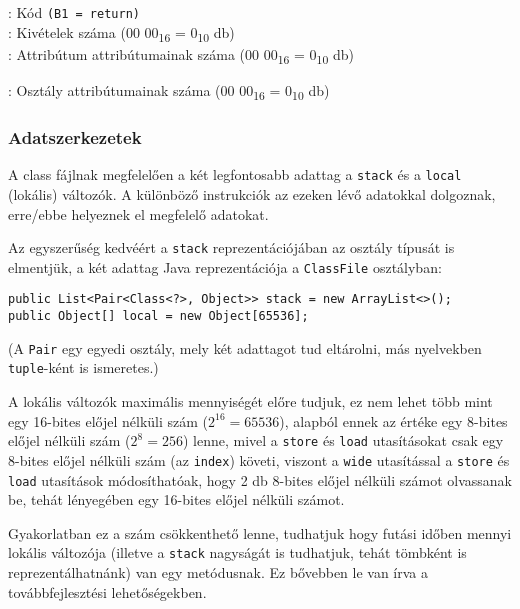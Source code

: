 \begin{compactitem}
\begin{compactitem}
\begin{compactitem}
\begin{compactitem}
                : Kód \lstinline{(B1 = return)}  \\
                : Kivételek száma (00 00\textsubscript{16} = 0\textsubscript{10} db) \\
                : Attribútum attribútumainak száma (00 00\textsubscript{16} = 0\textsubscript{10} db)
        \end{compactitem}
    \end{compactitem}
\end{compactitem}
\item {}: Osztály attribútumainak száma (00 00\textsubscript{16} = 0\textsubscript{10} db)
\end{compactitem}

\subsubsection{Adatszerkezetek}

A class fájlnak megfelelően a két legfontosabb adattag a \lstinline{stack} és a \lstinline{local} (lokális) változók. A különböző instrukciók az ezeken lévő adatokkal dolgoznak, erre/ebbe helyeznek el megfelelő adatokat.

Az egyszerűség kedvéért a \lstinline{stack} reprezentációjában az osztály típusát is elmentjük, a két adattag Java reprezentációja a \lstinline{ClassFile} osztályban:
\begin{verbatim}
public List<Pair<Class<?>, Object>> stack = new ArrayList<>();
public Object[] local = new Object[65536];
\end{verbatim}
(A \lstinline{Pair} egy egyedi osztály, mely két adattagot tud eltárolni, más nyelvekben \lstinline{tuple}-ként is ismeretes.)

A lokális változók maximális mennyiségét előre tudjuk, ez nem lehet több mint egy 16-bites előjel nélküli szám ($2^{16} = 65536$), alapból ennek az értéke egy 8-bites előjel nélküli szám ($2^8 = 256$) lenne, mivel a \lstinline{store} és \lstinline{load} utasításokat csak egy 8-bites előjel nélküli szám (az \lstinline{index}) követi, viszont a \lstinline{wide} utasítással a \lstinline{store} és \lstinline{load} utasítások módosíthatóak, hogy 2 db 8-bites előjel nélküli számot olvassanak be, tehát lényegében egy 16-bites előjel nélküli számot.

Gyakorlatban ez a szám csökkenthető lenne, tudhatjuk hogy futási időben mennyi lokális változója (illetve a \lstinline{stack} nagyságát is tudhatjuk, tehát tömbként is reprezentálhatnánk) van egy metódusnak. Ez bővebben le van írva a továbbfejlesztési lehetőségekben.

